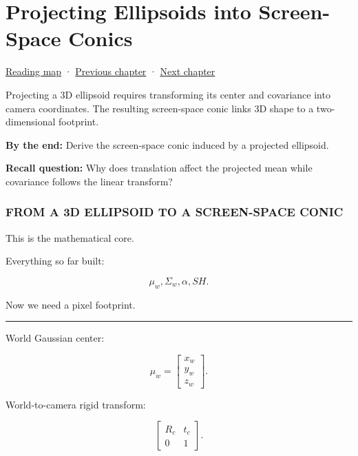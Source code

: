 \chapter{Projecting Ellipsoids into Screen-Space Conics}\label{04-visual-computing-ii-ch038-projecting-ellipsoids-into-screen-space-conics}\hypertarget{04-visual-computing-ii-ch038}{}\label{stagechapter:04-visual-computing-ii-ch038}

\hyperref[volume-reading-map]{Reading map} · \hyperref[04-visual-computing-ii-ch037-gaussian-splatting-and-editable-captured-worlds]{Previous chapter} · \hyperref[04-visual-computing-ii-ch039-tiling-ordering-and-compositing-at-scale]{Next chapter}

Projecting a 3D ellipsoid requires transforming its center and covariance into camera coordinates. The resulting screen-space conic links 3D shape to a two-dimensional footprint.

\textbf{By the end:} Derive the screen-space conic induced by a projected ellipsoid.

\textbf{Recall question:} Why does translation affect the projected mean while covariance follows the linear transform?

\subsection{FROM A 3D ELLIPSOID TO A SCREEN-SPACE CONIC}\label{04-visual-computing-ii-ch038-from-a-3d-ellipsoid-to-a-screen-space-conic}

This is the mathematical core.

Everything so far built:

\[
\mu_w,
\Sigma_w,
\alpha,
SH.
\]

Now we need a pixel footprint.

\begin{center}\rule{0.5\linewidth}{0.5pt}\end{center}

World Gaussian center:

\[
\mu_w=
\begin{bmatrix}
x_w\\y_w\\z_w
\end{bmatrix}.
\]

World-to-camera rigid transform:

\[
\begin{bmatrix}
R_c&t_c\\
0&1
\end{bmatrix}.
\]

